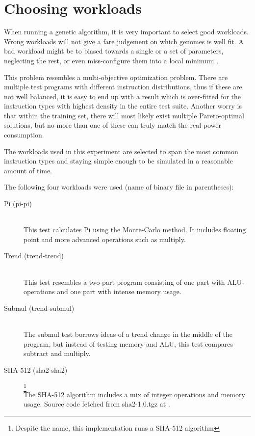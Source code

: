 \section{Choosing workloads}

When running a genetic algorithm, it is very important to select good workloads.
Wrong workloads will not give a fare judgement on which genomes is well fit. A
bad workload might be to biased towards a single or a set of parameters,
neglecting the rest, or even miss-configure them into a local minimum
\cite{introtoga}.

This problem resembles a multi-objective optimization problem. There are
multiple test programs with different instruction distributions, thus if these
are not well balanced, it is easy to end up with a result which is over-fitted
for the instruction types with highest density in the entire test suite. Another
worry is that within the training set, there will most likely exist multiple
Pareto-optimal solutions\cite{deb2014multi}, but no more than one of these can
truly match the real power consumption.

The workloads used in this experiment are selected to span the most common
instruction types and staying simple enough to be simulated in a reasonable
amount of time.

The following four workloads were used (name of binary file in parentheses):
\begin{description}
    \item[Pi (pi-pi)] \hfill \\
        This test calculates Pi using the Monte-Carlo method. It includes
        floating point and more advanced operations such as multiply.

    \item[Trend (trend-trend)] \hfill \\
        This test resembles a two-part program consisting of
        one part with ALU-operations and one part with intense memory usage.

    \item[Submul (trend-submul)] \hfill \\
        The submul test borrows ideas of a trend change in the middle of
        the program, but instead of testing memory and ALU, this test compares
        subtract and multiply.

    \item[SHA-512 (sha2-sha2)]
        \footnote{Despite the name, this implementation runs a  SHA-512
        algorithm} \hfill \\
        The SHA-512 algorithm includes a mix of integer operations and
        memory usage. Source code fetched from sha2-1.0.tgz at \cite{sha2}.
\end{description}

